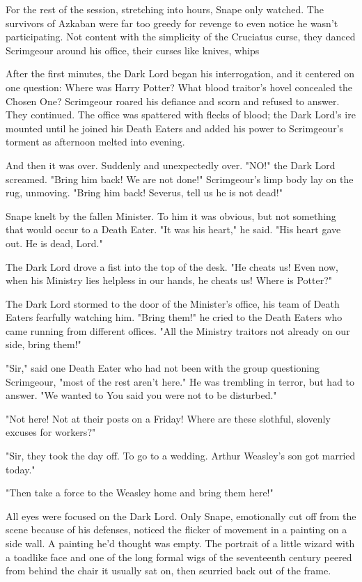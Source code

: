For the rest of the session, stretching into hours, Snape only watched. The survivors of Azkaban were far too greedy for revenge to even notice he wasn't participating. Not content with the simplicity of the Cruciatus curse, they danced Scrimgeour around his office, their curses like knives, whips{\el}

After the first minutes, the Dark Lord began his interrogation, and it centered on one question: Where was Harry Potter? What blood traitor's hovel concealed the Chosen One? Scrimgeour roared his defiance and scorn and refused to answer. They continued. The office was spattered with flecks of blood; the Dark Lord's ire mounted until he joined his Death Eaters and added his power to Scrimgeour's torment as afternoon melted into evening.

And then it was over. Suddenly and unexpectedly over. "NO!" the Dark Lord screamed. "Bring him back! We are not done!" Scrimgeour's limp body lay on the rug, unmoving. "Bring him back! Severus, tell us he is not dead!"

Snape knelt by the fallen Minister. To him it was obvious, but not something that would occur to a Death Eater. "It was his heart," he said. "His heart gave out. He is dead, Lord."

The Dark Lord drove a fist into the top of the desk. "He cheats us! Even now, when his Ministry lies helpless in our hands, he cheats us! Where is Potter?"

The Dark Lord stormed to the door of the Minister's office, his team of Death Eaters fearfully watching him. "Bring them!" he cried to the Death Eaters who came running from different offices. "All the Ministry traitors not already on our side, bring them!"

"Sir," said one Death Eater who had not been with the group questioning Scrimgeour, "most of the rest aren't here." He was trembling in terror, but had to answer. "We wanted to{\el} You said you were not to be disturbed."

"Not here! Not at their posts on a Friday! Where are these slothful, slovenly excuses for workers?"

"Sir, they took the day off. To go to a wedding. Arthur Weasley's son got married today."

"Then take a force to the Weasley home and bring them here!"

All eyes were focused on the Dark Lord. Only Snape, emotionally cut off from the scene because of his defenses, noticed the flicker of movement in a painting on a side wall. A painting he'd thought was empty. The portrait of a little wizard with a toadlike face and one of the long formal wigs of the seventeenth century peered from behind the chair it usually sat on, then scurried back out of the frame.

